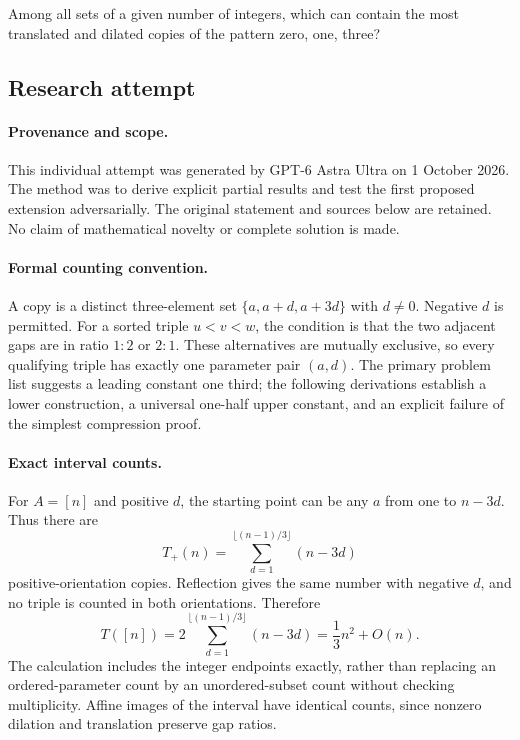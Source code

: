 \documentclass[11pt,a4paper]{article}
\begin{document}
Among all sets of a given number of integers, which can contain the most translated and dilated copies of the pattern zero, one, three?

\subsection{Research attempt}

\paragraph{Provenance and scope.}
This individual attempt was generated by GPT-6 Astra Ultra on 1 October 2026. The method was to derive explicit partial results and test the first proposed extension adversarially. The original statement and sources below are retained. No claim of mathematical novelty or complete solution is made.

\paragraph{Formal counting convention.}
A copy is a distinct three-element set $\{a,a+d,a+3d\}$ with $d\ne0$. Negative $d$ is permitted. For a sorted triple $u<v<w$, the condition is that the two adjacent gaps are in ratio $1:2$ or $2:1$. These alternatives are mutually exclusive, so every qualifying triple has exactly one parameter pair $(a,d)$. The primary problem list suggests a leading constant one third; the following derivations establish a lower construction, a universal one-half upper constant, and an explicit failure of the simplest compression proof.

\paragraph{Exact interval counts.}
For $A=[n]$ and positive $d$, the starting point can be any $a$ from one to $n-3d$. Thus there are
\[
 T_+(n)=\sum_{d=1}^{\lfloor(n-1)/3\rfloor}(n-3d)
\]
positive-orientation copies. Reflection gives the same number with negative $d$, and no triple is counted in both orientations. Therefore
\[
 T([n])=2\sum_{d=1}^{\lfloor(n-1)/3\rfloor}(n-3d)
       =\frac13n^2+O(n).
\]
The calculation includes the integer endpoints exactly, rather than replacing an ordered-parameter count by an unordered-subset count without checking multiplicity. Affine images of the interval have identical counts, since nonzero dilation and translation preserve gap ratios.
\end{document}
